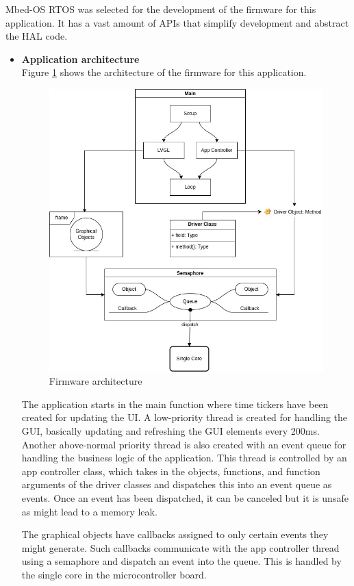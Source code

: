 Mbed-OS RTOS was selected for the development of the firmware for this application. It has a vast amount of APIs that simplify development and abstract the HAL code.
\begin{itemize}
    \item \textbf{Application architecture}\\
    Figure \ref{fig:firmware_architecture} shows the architecture of the firmware for this application.
    \begin{figure}[H]
        \centering
        \includegraphics[width=\textwidth]{Figures/firmwareArchitecture.jpg}
        \caption{Firmware architecture}
        \label{fig:firmware_architecture}
    \end{figure}
    The application starts in the main function where time tickers have been created for updating the UI. A low-priority thread is created for handling the GUI, basically updating and refreshing the GUI elements every 200ms. Another above-normal priority thread is also created with an event queue for handling the business logic of the application. This thread is controlled by an app controller class, which takes in the objects, functions, and function arguments of the driver classes and dispatches this into an event queue as events. Once an event has been dispatched, it can be canceled but it is unsafe as might lead to a memory leak. 
    \par 
    The graphical objects have callbacks assigned to only certain events they might generate. Such callbacks communicate with the app controller thread using a semaphore and dispatch an event into the queue. This is handled by the single core in the microcontroller board.


\end{itemize}
